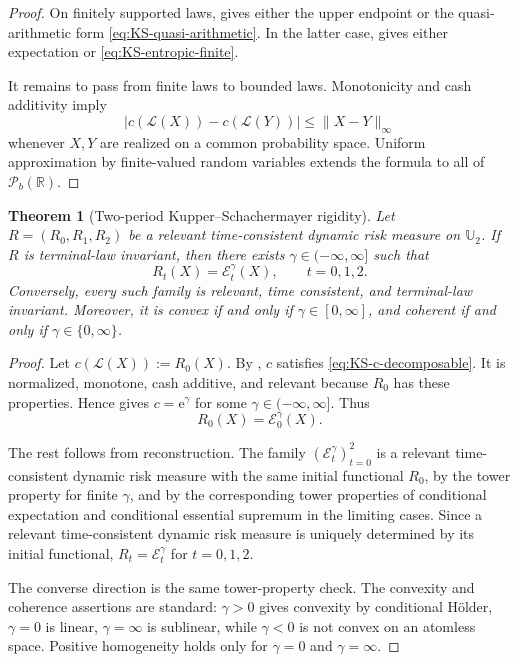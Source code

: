 \documentclass[a4paper]{amsart}
\newtheorem{theorem}{Theorem}[section]
\theoremstyle{definition}
\newcommand{\R}{\mathbb{R}}
\newcommand{\law}{\mathcal{L}}
\newcommand{\Pc}{\mathcal P}
\begin{document}
\begin{proof}
On finitely supported laws,  gives
either the upper endpoint or the quasi-arithmetic form
\eqref{eq:KS-quasi-arithmetic}. In the latter case,
 gives either expectation or
\eqref{eq:KS-entropic-finite}.

It remains to pass from finite laws to bounded laws. Monotonicity and cash
additivity imply
\[
|c(\law(X))-c(\law(Y))|\le \|X-Y\|_\infty
\]
whenever \(X,Y\) are realized on a common probability space. Uniform
approximation by finite-valued random variables extends the formula to all of
\(\Pc_b(\R)\).
\end{proof}

\begin{theorem}[Two-period Kupper--Schachermayer rigidity]
\label{thm:KS-two-period-rigidity}
Let \(R=(R_0,R_1,R_2)\) be a relevant time-consistent dynamic risk measure on
\(\mathbb U_2\). If \(R\) is terminal-law invariant, then there exists
\(\gamma\in(-\infty,\infty]\) such that
\[
R_t(X)=\mathcal E_t^\gamma(X),
\qquad t=0,1,2.
\]
Conversely, every such family is relevant, time consistent, and
terminal-law invariant. Moreover, it is convex if and only if
\(\gamma\in[0,\infty]\), and coherent if and only if
\(\gamma\in\{0,\infty\}\).
\end{theorem}

\begin{proof}
Let \(c(\law(X)):=R_0(X)\). By
, \(c\) satisfies
\eqref{eq:KS-c-decomposable}. It is normalized, monotone, cash additive, and
relevant because \(R_0\) has these properties. Hence
 gives \(c=\mathrm e^\gamma\) for
some \(\gamma\in(-\infty,\infty]\). Thus
\[
R_0(X)=\mathcal E_0^\gamma(X).
\]

The rest follows from reconstruction. The family
\((\mathcal E_t^\gamma)_{t=0}^2\) is a relevant time-consistent dynamic risk
measure with the same initial functional \(R_0\), by the tower property for
finite \(\gamma\), and by the corresponding tower properties of conditional
expectation and conditional essential supremum in the limiting cases. Since a
relevant time-consistent dynamic risk measure is uniquely determined by its
initial functional, \(R_t=\mathcal E_t^\gamma\) for \(t=0,1,2\).

The converse direction is the same tower-property check. The convexity and
coherence assertions are standard: \(\gamma>0\) gives convexity by conditional
Hölder, \(\gamma=0\) is linear, \(\gamma=\infty\) is sublinear, while
\(\gamma<0\) is not convex on an atomless space. Positive homogeneity holds
only for \(\gamma=0\) and \(\gamma=\infty\).
\end{proof}
\end{document}

